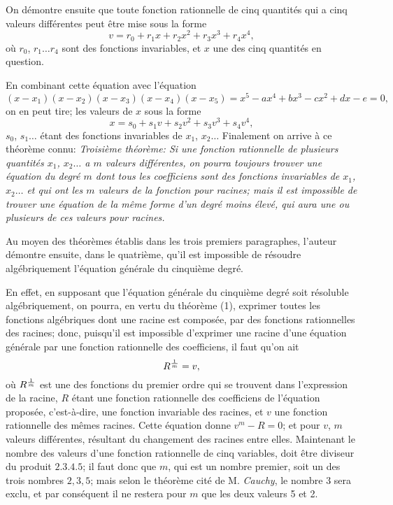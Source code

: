 \documentclass[oneside, 12 pt, leqno]{memoir}
\let\oldfrac\frac
\def\frac#1#2{\mathchoice{\text{\scalebox{.83}{${\oldfrac{#1}{#2}}$}}}{\text{\scalebox{.83}{${\displaystyle\oldfrac{#1}{#2}}$}}}{\genfrac{}{}{}{2}{#1}{#2}}{\genfrac{}{}{}{3}{#1}{#2}}}
\begin{document}
On démontre ensuite que toute fonction rationnelle de cinq quantités qui a cinq valeurs différentes peut être mise sous la forme
\[v=r_0+r_1 x+r_2 x^2+r_3 x^3+r_4 x^4,\]
où \(r_0\), \(r_1 \dots r_4\) sont des fonctions invariables, et \(x\) une des cinq quantités en question.

En combinant cette équation avec l'équation
\[\left(x-x_1\right)\left(x-x_2\right)\left(x-x_3\right)\left(x-x_4\right)\left(x-x_5\right) = x^5-a x^4+b x^3-c x^2+d x-e=0,\]
on en peut tire; les valeurs de \(x\) sous la forme
\[x=s_0+s_1 v+s_2 v^2+s_3 v^3+s_4 v^4,\]
\(s_0\), \(s_1 \dots\) étant des fonctions invariables de \(x_1\), \(x_2 \dots\) Finalement on arrive à ce théorème connu: \textit{Troisième théorème: Si une fonction rationnelle de plusieurs quantités \(x_1\), \(x_2 \dots\) a \(m\) valeurs différentes, on pourra toujours trouver une équation du degré \(m\) dont tous les coefficiens sont des fonctions invariables de \(x_1\), \(x_2\dots\) et qui ont les \(m\) valeurs de la fonction pour racines; mais il est impossible de trouver une équation de la même forme d'un degré moins élevé, qui aura une ou plusieurs de ces valeurs pour racines.}

Au moyen des théorèmes établis dans les trois premiers paragraphes, l'auteur démontre ensuite, dans le quatrième, qu'il est impossible de résoudre algébriquement l'équation générale du cinquième degré.

En effet, en supposant que l'équation générale du cinquième degré soit résoluble algébriquement, on pourra, en vertu du théorème (1), exprimer toutes les fonctions algébriques dont une racine est composée, par des fonctions rationnelles des racines; donc, puisqu'il est impossible d'exprimer une racine d'une équation générale par une fonction rationnelle des coefficiens, il faut qu'on ait
\[R^{\frac{1}{m}}=v,\]
où \(R^{\frac{1}{m}}\) est une des fonctions du premier ordre qui se trouvent dans l'expression de la racine, \(R\) étant une fonction rationnelle des coefficiens de l'équation proposée, c'est-à-dire, une fonction invariable des racines, et \(v\) une fonction rationnelle des mêmes racines. Cette équation donne \(v^m-{R}=0\); et pour \(v\), \(m\) valeurs différentes, résultant du changement des racines entre elles. Maintenant le nombre des valeurs d'une fonction rationnelle de cinq variables, doit être diviseur du produit \(2.3.4.5\); il faut donc que \(m\), qui est un nombre premier, soit un des trois nombres \(2,3,5\); mais selon le théorème cité de M. \textit{Cauchy}, le nombre 3 sera exclu, et par conséquent il ne restera pour \(m\) que les deux valeurs 5 et 2.
\end{document}
